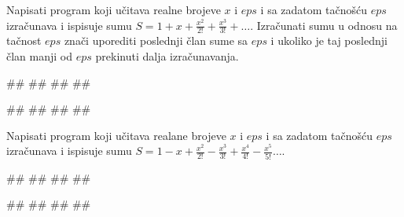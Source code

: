 \begin{Exercise}[difficulty=1, label=PET_42] 
Napisati program koji učitava realne brojeve $x$ i $eps$ i sa zadatom
tačnošću $eps$ izračunava i ispisuje sumu
$S=1+x+\frac{x^2}{2!}+\frac{x^3}{3!}+\ldots$.  Izračunati sumu u
odnosu na tačnost $eps$ znači uporediti poslednji član sume sa $eps$ i
ukoliko je taj poslednji član manji od $eps$ prekinuti dalja
izračunavanja.  
  
\begin{miditest}
\begin{upotreba}{1}
#\naslovInt#
##
##
##
\end{upotreba}
\end{miditest}
\begin{miditest}
\begin{upotreba}{2}
#\naslovInt#
##
##
##
\end{upotreba}
\end{miditest}

\end{Exercise}
\ifresenja
\begin{Answer}[ref=PET_42]
\end{Answer}
\fi


\begin{Exercise}[difficulty=1, label=PET_43]
Napisati program koji učitava realane brojeve $x$ i $eps$ i sa zadatom
tačnošću $eps$ izračunava i ispisuje sumu
$S=1-x+\frac{x^2}{2!}-\frac{x^3}{3!}+\frac{x^4}{4!}-\frac{x^5}{5!}\ldots$.
  
\begin{miditest}
\begin{upotreba}{1}
#\naslovInt#
##
##
##
\end{upotreba}
\end{miditest}
\begin{miditest}
\begin{upotreba}{2}
#\naslovInt#
##
##
##
\end{upotreba}
\end{miditest}

\end{Exercise}
\ifresenja
\begin{Answer}[ref=PET_43]
\end{Answer}
\fi


